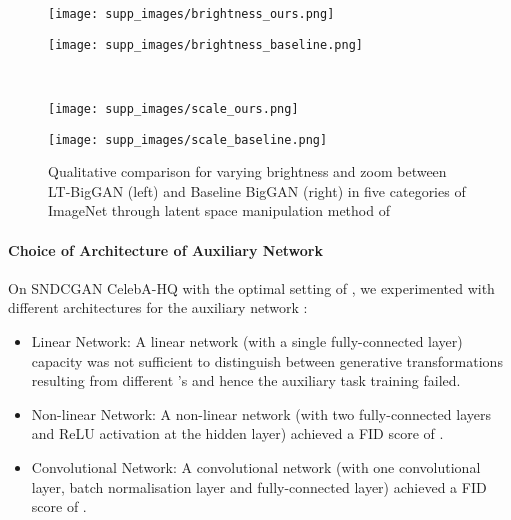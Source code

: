 \documentclass[10pt,twocolumn,letterpaper]{article}
\begin{document}
\begin{figure*}[t]
\centering
    \begin{minipage}{.48\textwidth}
    \texttt{[image: supp\_images/brightness\_ours.png]}
    \end{minipage}\hspace{0.05cm}
    \begin{minipage}{.48\textwidth}
    \texttt{[image: supp\_images/brightness\_baseline.png]}
    \end{minipage}\\
    \begin{minipage}{.48\textwidth}
    \texttt{[image: supp\_images/scale\_ours.png]}
    \end{minipage}\hspace{0.05cm}
    \begin{minipage}{.48\textwidth}
    \texttt{[image: supp\_images/scale\_baseline.png]}
    \end{minipage}
    \caption{\footnotesize{Qualitative comparison for varying brightness and zoom between LT-BigGAN (left) and Baseline BigGAN (right) in five categories of ImageNet through latent space manipulation method of \cite{controlling2020iclr}}}
    \label{fig:lt-biggan_imagenet_scale_zoom}
\end{figure*}

\paragraph{Choice of Architecture of Auxiliary Network }
On SNDCGAN CelebA-HQ with the optimal setting of , we experimented with different architectures for the auxiliary network :
\begin{itemize}
    \item Linear Network: A linear network (with a single fully-connected layer) capacity was not sufficient to distinguish between generative transformations resulting from different 's and hence the auxiliary task training failed.
    \noindent
    \vspace{-4pt}
\item Non-linear Network: A non-linear network (with two fully-connected layers and ReLU activation at the hidden layer) achieved a FID score of .
\noindent
    \vspace{-6pt}
    \item Convolutional Network: A convolutional network (with one convolutional layer, batch normalisation layer and fully-connected layer) achieved a FID score of . 
\end{itemize}
\end{document}
